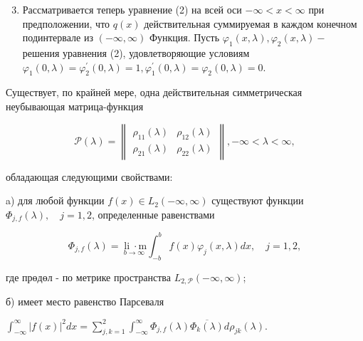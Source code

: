 \documentclass[10pt]{article}
\begin{document}
\begin{enumerate}

  \setcounter{enumi}{2}

  \item Рассматривается теперь уравнение (2) на всей оси $-\infty<x<\infty$ при предположении, что $q(x)$ действительная суммируемая в каждом конечном подинтервале из $(-\infty, \infty)$ Функция. Пусть $\varphi_{1}(x, \lambda), \varphi_{2}(x, \lambda)-$ решения уравнения (2), удовлетворяющие условиям $\varphi_{1}(0, \lambda)=\varphi_{2}^{\prime}(0, \lambda)=1, \varphi_{1}^{\prime}(0, \lambda)=\varphi_{2}(0, \lambda)=0$.

\end{enumerate}



Существует, по крайней мере, одна действительная симметрическая неубывающая матрица-функция



\[

\mathscr{P}(\lambda)=\left\|\begin{array}{ll}

\rho_{11}(\lambda) & \rho_{12}(\lambda) \\

\rho_{21}(\lambda) & \rho_{22}(\lambda)

\end{array}\right\|,-\infty<\lambda<\infty,

\]



обладающая следующими свойствами:



a) для любой функции $f(x) \in L_{2}(-\infty, \infty)$ существуют функции $\Phi_{j, f}(\lambda), \quad j=1,2$, определенные равенствами



\[

\Phi_{j, f}(\lambda)=\underset{b \rightarrow \infty}{\operatorname{li} \cdot \mathrm{m}} \int_{-b}^{b} f(x) \varphi_{j}(x, \lambda) d x, \quad j=1,2,

\]



где прөдөл - по метрике пространства $L_{2, \mathscr{P}}(-\infty, \infty)$;



б) имеет место равенство Парсеваля



$\int_{-\infty}^{\infty}|f(x)|^{2} d x=\sum_{j, k=1}^{2} \int_{-\infty}^{\infty} \Phi_{j, f}(\lambda) \overline{\Phi_{k}(\lambda)} d \rho_{j k}(\lambda)$.
\end{document}

